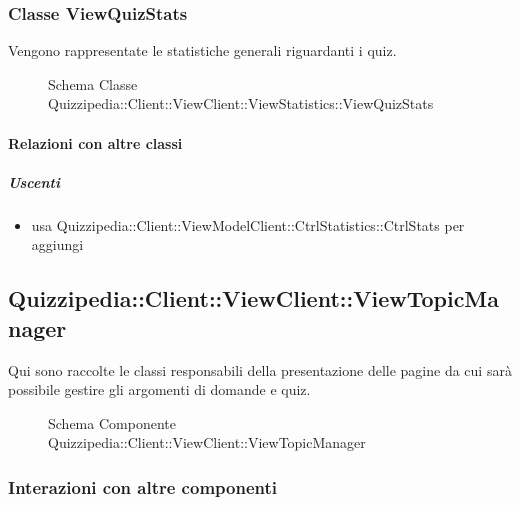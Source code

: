 \subsubsection{Classe ViewQuizStats}
Vengono rappresentate le statistiche generali riguardanti i quiz.
\begin{figure}[H]
\centering
\noindent{}
\caption[Schema Classe ViewQuizStats]{Schema Classe Quizzipedia::Client::ViewClient::ViewStatistics::ViewQuizStats}
\end{figure}
\paragraph{Relazioni con altre classi}
\subparagraph{Uscenti}
\begin{itemize}
\item usa Quizzipedia::Client::ViewModelClient::CtrlStatistics::CtrlStats per aggiungi
\end{itemize}
\subsection{Quizzipedia::Client::ViewClient::ViewTopicManager}
Qui sono raccolte le classi responsabili della presentazione delle pagine da cui sarà possibile gestire gli argomenti di domande e quiz.
\begin{figure}[H]
\centering
\noindent{}
\caption[Schema Componente Quizzipedia::Client::ViewClient::ViewTopicManager]{Schema Componente Quizzipedia::Client::ViewClient::ViewTopicManager}
\end{figure}
\subsubsection{Interazioni con altre componenti}

